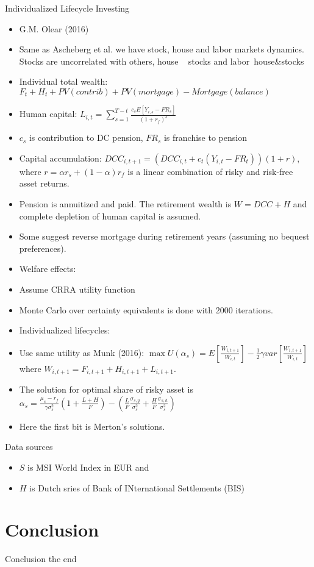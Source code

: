 \documentclass{beamer}
\begin{document}
\begin{frame}[allowframebreaks]{Individualized Lifecycle Investing}
  \begin{itemize}
    \item G.M. Olear (2016)
    \item Same as Ascheberg et al. we have stock, house and labor markets dynamics. Stocks are uncorrelated with others, house ~ stocks and labor~house\&stocks
    \item Individual total wealth: $F_t+H_t+PV(contrib) + PV(mortgage) - Mortgage(balance)$
    \item Human capital: $L_{i,t} = \sum\limits^{T-t}_{s=1}\frac{c_s E[Y_{i,s}-FR_s]}{(1+r_f)^s}$
    \item $c_s$ is contribution to DC pension, $FR_s$ is franchise to pension

\framebreak

    \item Capital accumulation: $DCC_{i,t+1} = (DCC_{i,t} + c_t(Y_{i,t}-FR_t))(1+r)$, where $r = \alpha r_s + (1-\alpha) r_f$ is a linear combination of risky and risk-free asset returns.
    \item Pension is annuitized and paid. The retirement wealth is $W = DCC + H$ and complete depletion of human capital is assumed.
    \item Some suggest reverse mortgage during retirement years (assuming no bequest preferences).

\framebreak

    \item Welfare effects:
    \item Assume CRRA utility function
    \item Monte Carlo over certainty equivalents is done with 2000 iterations.

\framebreak

    \item Individualized lifecycles:
    \item Use same utility as Munk (2016): $\max U(\alpha_s) = E[\frac{W_{i,t+1}}{W_{i,t}}] - \frac{1}{2}\gamma var[\frac{W_{i,t+1}}{W_{i,t}}]$ where $W_{i,t+1} = F_{i,t+1}+H_{i,t+1}+L_{i,t+1}$.
    \item The solution for optimal share of risky asset is $\alpha_s = \frac{\mu_s-r_f}{\gamma \sigma_s^2}(1+\frac{L+H}{F}) - (\frac{L}{F}\frac{\sigma_{s,y}}{\sigma^2_s} + \frac{H}{F}\frac{\sigma_{s,h}}{\sigma_s^2})$
    \item Here the first bit is Merton's solutions.

  \end{itemize}
\end{frame}
 
\begin{frame}[allowframebreaks]{Data sources}
  \begin{itemize}
    \item $S$ is MSI World Index in EUR and 
    \item $H$ is Dutch sries of Bank of INternational Settlements (BIS) 
  \end{itemize}
\end{frame}

\section{Conclusion}
\begin{frame}{Conclusion}
  the end
\end{frame}
\end{document}
